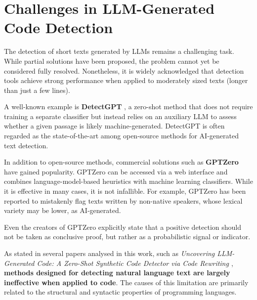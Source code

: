 
\section{Challenges in LLM-Generated Code Detection}
\label{sec:Challenges in LLM-Generated Code Detection}
The detection of short texts generated by LLMs remains 
a challenging task. While partial solutions have been 
proposed, the problem cannot yet be considered fully 
resolved. Nonetheless, it is widely acknowledged that 
detection tools achieve strong performance when applied 
to moderately sized texts (longer than just a few lines).

A well-known example is \textbf{DetectGPT}
\cite{mitchell2023detectgpt}, a 
zero-shot method that does not require training a 
separate classifier but instead relies on an 
auxiliary LLM to assess whether a given passage is 
likely machine-generated. 
DetectGPT is often regarded as the state-of-the-art 
among open-source methods for AI-generated text detection.


In addition to open-source methods, commercial 
solutions such as \textbf{GPTZero} \cite{GPTZeroMethodology2023}
have gained 
popularity. GPTZero can be accessed via a web 
interface and combines language-model-based heuristics 
with machine learning classifiers. While it is 
effective in many cases, it is not infallible. 
For example, GPTZero has been reported to mistakenly 
flag texts written by non-native speakers, 
whose lexical variety may be lower, as AI-generated.

Even the creators of GPTZero explicitly state 
that a positive detection should not be taken as 
conclusive proof, but rather as a probabilistic 
signal or indicator.

\vspace{1\baselineskip}
\noindent

As stated in several papers analysed in this work, 
such as \textit{Uncovering LLM-Generated Code: A 
Zero-Shot Synthetic Code Detector via Code Rewriting 
\cite{ye2023uncovering}}, \textbf{methods designed for 
detecting natural language text are largely 
ineffective when applied to code}. The causes of 
this limitation are primarily related to the 
structural and syntactic properties of programming 
languages. 

